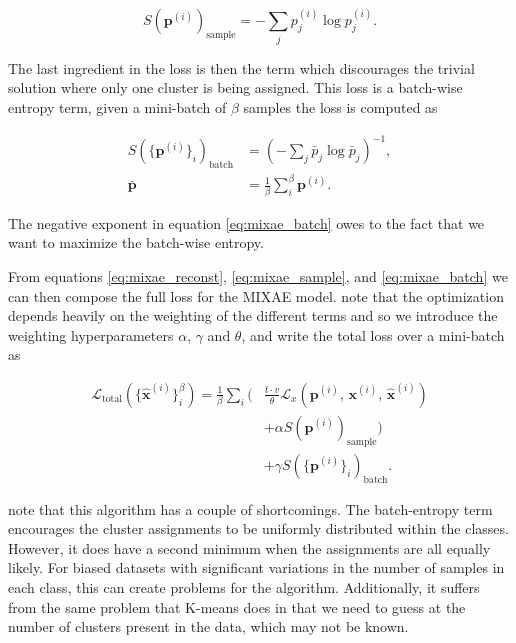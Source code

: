 \begin{equation}\label{eq:mixae_sample}
S(\mathbf{p}^{(i)})_{\text{sample}} = -\sum_j p_j^{(i)} \log p_j^{(i)}. 
\end{equation}

\noindent The last ingredient in the loss is then the term which discourages the trivial solution where only one cluster is being assigned. This loss is a batch-wise entropy term, given a mini-batch of $\beta$ samples the loss is computed as 

\begin{equation}\label{eq:mixae_batch}
\begin{split}
S(\{\mathbf{p}^{(i)}\}_i)_{\text{batch}}&= \left(-\sum_j \bar{p}_j \log \bar{p}_j \right)^{-1},\\
\bar{\mathbf{p}} &= \frac{1}{\beta} \sum_i ^\beta \mathbf{p}^{(i)} .
\end{split}
\end{equation}

\noindent The negative exponent in equation \ref{eq:mixae_batch} owes to the fact that we want to maximize the batch-wise entropy.

From equations \ref{eq:mixae_reconst}, \ref{eq:mixae_sample}, and \ref{eq:mixae_batch} we can then compose the full loss for the MIXAE model. \cite{Zhang} note that the optimization depends heavily on the weighting of the different terms and so we introduce the weighting hyperparameters $\alpha$, $\gamma$ and $\theta$, and write the total loss over a mini-batch as 

\begin{equation}\label{eq:mixae_loss}
\begin{split}
\mathcal{L}_{\text{total}}(\{\hat{\mathbf{x}}^{(i)}\}^\beta_i) = \frac{1}{\beta}\sum_i \Big( &\frac{t\cdot v}{\theta} \mathcal{L}_x(\mathbf{p}^{(i)},\,\mathbf{x}^{(i)},\, \hat{\mathbf{x}}^{(i)} ) \\
&+ \alpha S(\mathbf{p}^{(i)})_{\text{sample}} \Big) \\
&+\gamma S(\{\mathbf{p}^{(i)}\}_i)_{\text{batch}}.
\end{split}
\end{equation}

\noindent \citet{Zhang} note that this algorithm has a couple of shortcomings. The batch-entropy term encourages the cluster assignments to be uniformly distributed within the classes. However, it does have a second minimum when the assignments are all equally likely. For biased datasets with significant variations in the number of samples in each class, this can create problems for the algorithm. Additionally, it suffers from the same problem that K-means does in that we need to guess at the number of clusters present in the data, which may not be known. 
